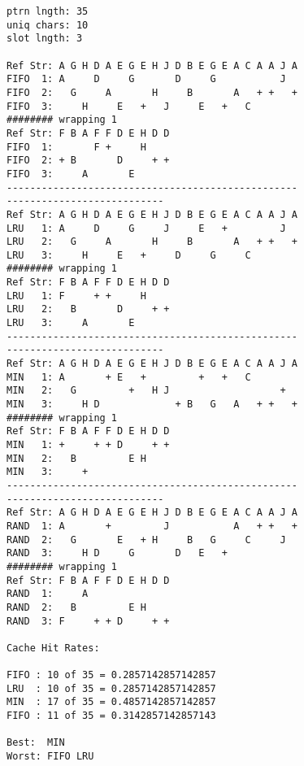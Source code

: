 \documentclass[11pt]{article}
\begin{document}
\begin{lstlisting}
ptrn lngth: 35
uniq chars: 10
slot lngth: 3

Ref Str: A G H D A E G E H J D B E G E A C A A J A
FIFO  1: A     D     G       D     G           J
FIFO  2:   G     A       H     B       A   + +   +
FIFO  3:     H     E   +   J     E   +   C
######## wrapping 1
Ref Str: F B A F F D E H D D
FIFO  1:       F +     H
FIFO  2: + B       D     + +
FIFO  3:     A       E
--------------------------------------------------
---------------------------
Ref Str: A G H D A E G E H J D B E G E A C A A J A
LRU   1: A     D     G     J     E   +         J
LRU   2:   G     A       H     B       A   + +   +
LRU   3:     H     E   +     D     G     C
######## wrapping 1
Ref Str: F B A F F D E H D D
LRU   1: F     + +     H
LRU   2:   B       D     + +
LRU   3:     A       E
--------------------------------------------------
---------------------------
Ref Str: A G H D A E G E H J D B E G E A C A A J A
MIN   1: A       + E   +         +   +   C
MIN   2:   G         +   H J                   +
MIN   3:     H D             + B   G   A   + +   +
######## wrapping 1
Ref Str: F B A F F D E H D D
MIN   1: +     + + D     + +
MIN   2:   B         E H
MIN   3:     +
--------------------------------------------------
---------------------------
Ref Str: A G H D A E G E H J D B E G E A C A A J A
RAND  1: A       +         J           A   + +   +
RAND  2:   G       E   + H     B   G     C     J
RAND  3:     H D     G       D   E   +
######## wrapping 1
Ref Str: F B A F F D E H D D
RAND  1:     A
RAND  2:   B         E H
RAND  3: F     + + D     + +

Cache Hit Rates:

FIFO : 10 of 35 = 0.2857142857142857
LRU  : 10 of 35 = 0.2857142857142857
MIN  : 17 of 35 = 0.4857142857142857
FIFO : 11 of 35 = 0.3142857142857143

Best:  MIN
Worst: FIFO LRU
\end{lstlisting}
\end{document}
